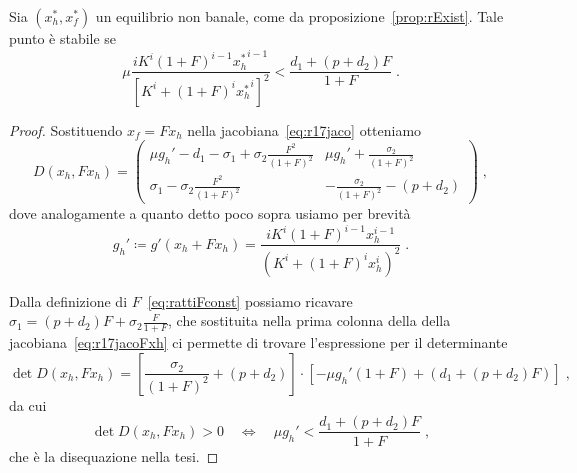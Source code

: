 \begin{proposizione}
    Sia $(x_h^*, x_f^*)$ un equilibrio non banale, come da proposizione~\ref{prop:rExist}.
    Tale punto è stabile se
    $$ \mu \frac{ i K^i (1+F)^{i-1}{x_h^*}^{i-1} }{ {\left[ K^i +(1+F)^i {x_h^*}^i \right]}^2 }
    < \frac{d_1 + (p+d_2)F}{1+F} \; .$$
    \label{prop:ratti2Dstab}
\end{proposizione}

\begin{proof}
    Sostituendo $x_f = F x_h$ nella jacobiana~\eqref{eq:r17jaco} otteniamo
    \begin{equation}
    D(x_h, F x_h) =
    \begin{pmatrix}
        \mu g_h' -d_1 - \sigma_1 + \sigma_2 \frac{F^2}{(1+F)^2}
        & \mu g_h' + \frac{\sigma_2}{(1+F)^2}
        \\
        \sigma_1 - \sigma_2 \frac{F^2}{(1+F)^2}
        & - \frac{\sigma_2}{(1+F)^2} - (p+d_2)
    \end{pmatrix} \; ,
    \label{eq:r17jacoFxh}
\end{equation}
dove analogamente a quanto detto poco sopra usiamo per brevità
\begin{equation}
g_h' \coloneq g'( x_h + F x_h ) = \frac{i K^i {(1+F)}^{i-1} x_h^{i-1} }{ { \left( K^i + {(1+F)}^i x_h^i
        \right)  }^2 } \; .
    \label{eq:gPrimoF}
\end{equation}

Dalla definizione di $F$~\eqref{eq:rattiFconst} possiamo ricavare
$\sigma_1 = (p+d_2)F + \sigma_2 \frac{F}{1+F}$, che sostituita nella prima colonna della
della jacobiana~\eqref{eq:r17jacoFxh} ci permette di trovare l'espressione per il determinante
$$
\det D(x_h, F x_h) =
\left[ \frac{\sigma_2}{(1+F)^2} +(p+d_2) \right] \cdot
\left[ { - \mu g_h' (1+F) + \left( d_1 +(p+d_2)F \right) } \right]
\; ,
$$
da cui
$$
\det D(x_h, F x_h) > 0 \quad \iff \quad
\mu g_h' < \frac{d_1 + (p+d_2)F}{1+F} \; ,$$
che è la disequazione nella tesi.


\end{proof}
